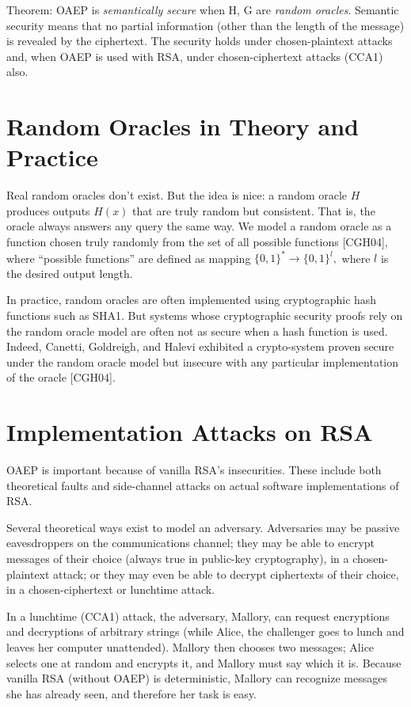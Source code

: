 \documentclass[10pt]{article}
\begin{document}
Theorem: OAEP is \textit{semantically secure} when H, G are \textit{random oracles}. Semantic security means that no partial information (other than the length of the message) is revealed by the ciphertext. The security holds under chosen-plaintext attacks and, when OAEP is used with RSA, under chosen-ciphertext attacks (CCA1) also. 

\section{Random Oracles in Theory and Practice}

Real random oracles don't exist. But the idea is nice: a random oracle $H$ produces outputs $H(x)$ that are truly random but consistent. That is, the oracle always answers any query the same way. We model a random oracle as a function chosen truly randomly from the set of all possible functions [CGH04], where ``possible functions'' are defined as mapping $\{0, 1\}^* \rightarrow \{0,1\}^l,$ where $l$ is the desired output length. 

In practice, random oracles are often implemented using cryptographic hash functions such as SHA1. But systems whose cryptographic security proofs rely on the random oracle model are often not as secure when a hash function is used. Indeed, Canetti, Goldreigh, and Halevi exhibited a crypto-system proven secure under the random oracle model but insecure with any particular implementation of the oracle [CGH04]. 

\section{Implementation Attacks on RSA}
OAEP is important because of vanilla RSA's insecurities. These include both theoretical faults and side-channel attacks on actual software implementations of RSA. 

Several theoretical ways exist to model an adversary. Adversaries may be passive eavesdroppers on the communications channel; they may be able to encrypt messages of their choice (always true in public-key cryptography), in a chosen-plaintext attack; or they may even be able to decrypt ciphertexts of their choice, in a chosen-ciphertext or lunchtime attack. 

In a lunchtime (CCA1) attack, the adversary, Mallory, can request encryptions and decryptions of arbitrary strings (while Alice, the challenger goes to lunch and leaves her computer unattended). Mallory then chooses two messages; Alice selects one at random and encrypts it, and Mallory must say which it is. Because vanilla RSA (without OAEP) is deterministic, Mallory can recognize messages she has already seen, and therefore her task is easy. 
\end{document}
